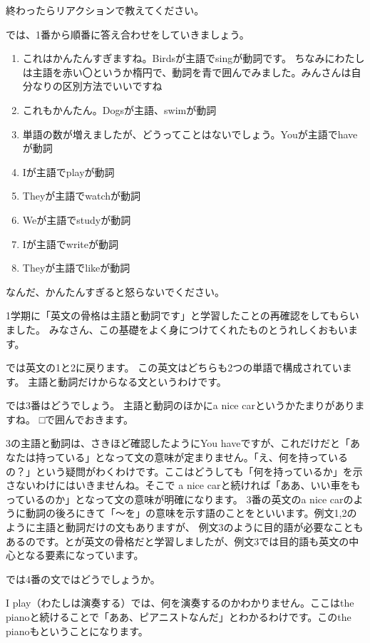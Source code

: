 \documentclass[book,jafontscale=0.9247]{jlreq}
\begin{document}
終わったらリアクションで教えてください。

では、1番から順番に答え合わせをしていきましょう。

\begin{enumerate}
 \item これはかんたんすぎますね。Birdsが主語でsingが動詞です。
ちなみにわたしは主語を赤い〇というか楕円で、動詞を青で囲んでみました。みんさんは自分なりの区別方法でいいですね
 \item これもかんたん。Dogsが主語、swimが動詞
 \item 単語の数が増えましたが、どうってことはないでしょう。Youが主語でhaveが動詞
 \item Iが主語でplayが動詞
 \item Theyが主語でwatchが動詞
 \item Weが主語でstudyが動詞
 \item Iが主語でwriteが動詞
 \item Theyが主語でlikeが動詞
\end{enumerate}

なんだ、かんたんすぎると怒らないでください。

1学期に「英文の骨格は主語と動詞です」と学習したことの再確認をしてもらいました。
みなさん、この基礎をよく身につけてくれたものとうれしくおもいます。

では英文の1と2に戻ります。
この英文はどちらも2つの単語で構成されています。
主語と動詞だけからなる文というわけです。

では3番はどうでしょう。
主語と動詞のほかにa nice carというかたまりがありますね。
□で囲んでおきます。

3の主語と動詞は、さきほど確認したようにYou haveですが、これだけだと「あなたは持っている」となって文の意味が定まりません。「え、何を持っているの？」という疑問がわくわけです。ここはどうしても「何を持っているか」を示さないわけにはいきませんね。そこで a nice carと続ければ「ああ、いい車をもっているのか」となって文の意味が明確になります。
3番の英文のa nice carのように動詞の後ろにきて「～を」の意味を示す語のことをといいます。例文1,2のように主語と動詞だけの文もありますが、
例文3のように目的語が必要なこともあるのです。とが英文の骨格だと学習しましたが、例文3では目的語も英文の中心となる要素になっています。

では4番の文ではどうでしょうか。

I play（わたしは演奏する）では、何を演奏するのかわかりません。ここはthe pianoと続けることで「ああ、ピアニストなんだ」とわかるわけです。このthe pianoもということになります。
\end{document}
